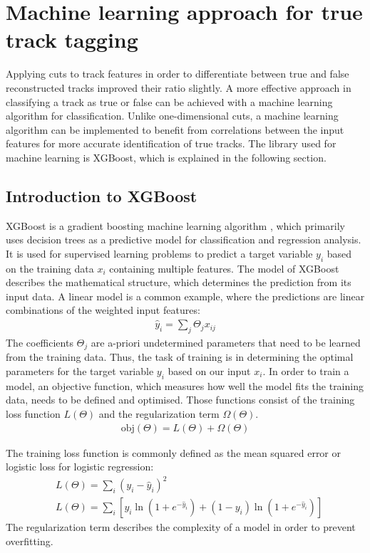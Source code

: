 \chapter{Machine learning approach for true track tagging}
Applying cuts to track features in order to differentiate between true and false reconstructed tracks improved their ratio slightly. A more effective
approach in classifying a track as true or false can be achieved with a machine learning algorithm for classification. Unlike one-dimensional cuts, a machine learning
algorithm can be implemented to benefit from correlations between the input features for more accurate identification of true tracks. The library used for
machine learning is XGBoost, which is explained in the following section.

\section{Introduction to XGBoost}
XGBoost \cite{xgboost} is a gradient boosting machine learning algorithm \cite{gradient}, which primarily uses decision trees as a predictive model for classification and regression analysis.
It is used for supervised learning problems to predict a target variable $y_i$ based on the training data $x_i$ containing multiple features. The model
of XGBoost describes the mathematical structure, which determines the prediction from its input data. A linear model is a common example, where the predictions
are linear combinations of the weighted input features:
\begin{align}
  \hat{y}_i = \sum_j \Theta_j x_{ij}
\end{align}
The coefficients $\Theta_j$ are a-priori undetermined parameters that need to be learned from the training data. Thus, the task of training is in determining the optimal parameters
for the target variable $y_i$ based on our input $x_i$. In order to train a model, an objective function, which measures how well
the model fits the training data, needs to be defined and optimised. Those functions consist of the training loss function $L(\Theta) $ and the regularization term $\Omega (\Theta)$.
\begin{align}
  \text{obj}(\Theta) = L(\Theta) + \Omega(\Theta)
\end{align}

The training loss function is commonly defined as the mean squared error or logistic loss for logistic regression:
\begin{align}
  &L(\Theta) = \sum_i (y_i - \hat{y}_i)^2 \\
  &L(\Theta) = \sum_i [y_i \ln{(1 + e^{-\hat{y}_i})} + (1 - y_i) \ln{(1 + e^{-\hat{y}_i})}]
\end{align}
The regularization term describes the complexity of a model in order to prevent overfitting.

